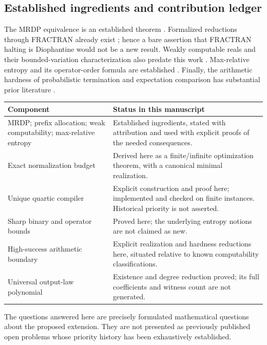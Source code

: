 \documentclass[11pt,letterpaper]{article}
\numberwithin{equation}{section}
\theoremstyle{definition}
\theoremstyle{remark}
\begin{document}
\subsection{Established ingredients and contribution ledger}
The MRDP equivalence is an established theorem \cite{matiyasevich}. Formalized reductions through
FRACTRAN already exist \cite{larchey-forster}; hence a bare assertion that
FRACTRAN halting is Diophantine would not be a new result. Weakly computable
reals and their bounded-variation characterization also predate this work
\cite{ambos-spies,ng-stephan-wu}. Max-relative entropy and its operator-order
formula are established \cite{datta}. Finally, the arithmetic hardness of
probabilistic termination and expectation comparison has substantial prior
literature \cite{kaminski-katoen}.

\begin{center}
\small
\begin{tabular}{p{}p{}}
\toprule
Component & Status in this manuscript\\
\midrule
MRDP; prefix allocation; weak computability; max-relative entropy &
Established ingredients, stated with attribution and used with explicit proofs
of the needed consequences.\\[3pt]
Exact normalization budget &
Derived here as a finite/infinite optimization theorem, with a canonical
minimal realization.\\[3pt]
Unique quartic compiler &
Explicit construction and proof here; implemented and checked on finite
instances. Historical priority is not asserted.\\[3pt]
Sharp binary and operator bounds &
Proved here; the underlying entropy notions are not claimed as new.\\[3pt]
High-success arithmetic boundary &
Explicit realization and hardness reductions here, situated relative to
known computability classifications.\\[3pt]
Universal output-law polynomial &
Existence and degree reduction proved; its full coefficients and witness
count are not generated.\\
\bottomrule
\end{tabular}
\end{center}

The questions answered here are precisely formulated mathematical questions
about the proposed extension. They are not presented as previously published
open problems whose priority history has been exhaustively established.
\end{document}
